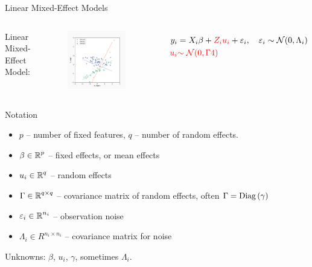 \documentclass[8pt]{beamer}
\begin{document}
\begin{frame}{Linear Mixed-Effect Models}
\begin{columns}[T,onlytextwidth]
   	
    	\centering  Linear Mixed-Effect Model:
   	\begin{figure}
   		\includegraphics[width=0.9\textwidth]{Figures/lme_example_random_prediction}
   	\end{figure}
   	   		\[
   		\begin{split}
   			y_i & = X_i\beta + {\color{red}Z_i u_i} + \varepsilon_i, \quad \varepsilon_i \sim \operatorname{\mathcal{N}}(0, \Lambda_i) \\
   			{\color{red} u_i} & {\color{red}\sim \operatorname{\mathcal{N}}(0, \Gamma4)}
   		\end{split}
   		\]

   	
  \end{columns}
\end{frame}

\begin{frame}{Notation}
   	
   	\begin{itemize}
   		\item $p$ -- number of fixed features, $q$ -- number of random effects.
   		\item $\beta \in \operatorname{\mathbb{R}}^p$ -- fixed effects, or mean effects
   		\item $u_i \in \operatorname{\mathbb{R}}^q$ -- random effects
   		\item $\Gamma \in \operatorname{\mathbb{R}}^{q \times q}$ -- covariance matrix of random effects, often $\Gamma = \operatorname{Diag}{(\gamma)}$
   		\item $\varepsilon_i \in \operatorname{\mathbb{R}}^{n_i}$ -- observation noise
   		\item $\Lambda_i \in R^{n_i \times n_i}$ -- covariance matrix for noise
   	\end{itemize}
   	Unknowns: $\beta$, $u_i$, $\gamma$, sometimes $\Lambda_i$.
\end{frame}
\end{document}
